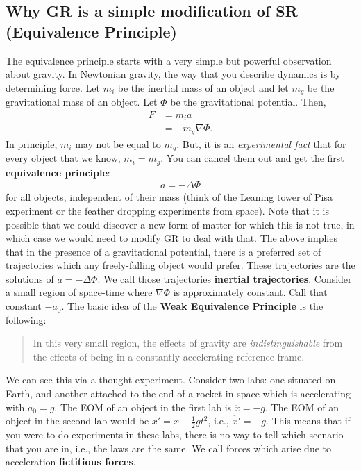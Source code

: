 \documentclass[11pt]{article}
\theoremstyle{definition}
\begin{document}
\subsection{Why GR is a simple modification of SR (Equivalence Principle)}
The equivalence principle starts with a very simple but powerful observation about gravity. In Newtonian gravity, the way that you describe dynamics is by determining force. Let \( m_i \) be the inertial mass of an object and let \( m_g \) be the gravitational mass of an object. Let \( \Phi \) be the gravitational potential. Then, 
\begin{align*}
	F & = m_i a \\
	& = - m_g \nabla \Phi. 
\end{align*}
In principle, \( m_i \) may not be equal to \( m_g \). But, it is an \emph{experimental fact} that for every object that we know, \( m_i = m_g \). You can cancel them out and get the first \textbf{equivalence principle}: 
\begin{align} 
	\boxed{ a = - \Delta \Phi  } 
\end{align} 
for all objects, independent of their mass (think of the Leaning tower of Pisa experiment or the feather dropping experiments from space). Note that it is possible that we could discover a new form of matter for which this is not true, in which case we would need to modify GR to deal with that. The above implies that in the presence of a gravitational potential, there is a preferred set of trajectories which any freely-falling object would prefer. These trajectories are the solutions of \( a = - \Delta \Phi \). We call those trajectories \textbf{inertial trajectories}. 
\newline
\newline
Consider a small region of space-time where \( \nabla \Phi \) is approximately constant. Call that constant \( - a_0 \). The basic idea of the \textbf{Weak Equivalence Principle} is the following: 
\begin{quote}
	In this very small region, the effects of gravity are \emph{indistinguishable} from the effects of being in a constantly accelerating reference frame. 
\end{quote}
We can see this via a thought experiment. Consider two labs: one situated on Earth, and another attached to the end of a rocket in space which is accelerating with \( a_0 = g \). The EOM of an object in the first lab is \( \ddot{x} = -g \). The EOM of an object in the second lab would be \( x' = x- \frac{1}{2} gt^2 \), i.e., \( \ddot{x'} = -g \). This means that if you were to do experiments in these labs, there is no way to tell which scenario that you are in, i.e., the laws are the same. We call forces which arise due to acceleration \textbf{fictitious forces}. 
\end{document}
